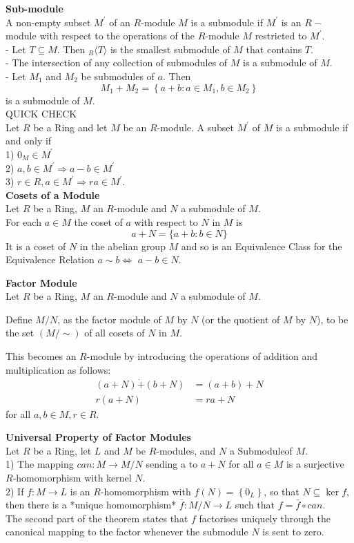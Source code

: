 \documentclass[a4paper, 10pt]{article}
\begin{document}
\begin{multicols*}{3}
\textbf{Sub-module}\\
A non-empty subset $M^{\prime}$ of an $R$-module $M$ is a submodule if $M^{\prime}$ is an $R-$ module with respect to the operations of the $R$-module $M$ restricted to $M^{\prime}$.\\
- Let $T \subseteq M$. Then ${ }_R\langle T\rangle$ is the smallest submodule of $M$ that contains $T$.\\
- The intersection of any collection of submodules of $M$ is a submodule of $M$.\\
- Let $M_1$ and $M_2$ be submodules of $a$. Then
$$
M_1+M_2=\left\{a+b: a \in M_1, b \in M_2\right\}
$$
	is a submodule of $M$.\\
QUICK CHECK\\
Let $R$ be a Ring and let $M$ be an $R$-module. A subset $M^{\prime}$ of $M$ is a submodule if and only if\\
1) $0_M \in M^{\prime}$\\
2) $a, b \in M^{\prime} \Rightarrow a-b \in M^{\prime}$\\
3) $r \in R, a \in M^{\prime} \Rightarrow r a \in M^{\prime}$.\\

\textbf{Cosets of a Module}\\
Let $R$ be a Ring, $M$ an $R$-module and $N$ a submodule of $M$. \\
For each $a \in M$ the coset of $a$ with respect to $N$ in $M$ is
$$
a+N=\{a+b: b \in N\}
$$
It is a coset of $N$ in the abelian group $M$ and so is an Equivalence Class for the Equivalence Relation $a \sim b \Leftrightarrow$ $a-b \in N$. 

\textbf{Factor Module}\\
Let $R$ be a Ring, $M$ an $R$-module and $N$ a submodule of $M$. 

Define $M / N$, as the factor module of $M$ by $N$ (or the quotient of $M$ by $N$), to be the set $(M / \sim)$ of all cosets of $N$ in $M$. 

This becomes an $R$-module by introducing the operations of addition and multiplication as follows:
$$
\begin{aligned}
(a+N) \dot{+}(b+N) & =(a+b)+N \\
r(a+N) & =r a+N
\end{aligned}
$$
for all $a, b \in M, r \in R$. 

\textbf{Universal Property of Factor Modules}\\
Let $R$ be a Ring, let $L$ and $M$ be $R$-modules, and $N$ a Submoduleof $M$.\\
1) The mapping $can : M \rightarrow M / N$ sending a to $a+N$ for all $a \in M$ is a surjective $R$-homomorphism with kernel $N$.\\
2) If $f: M \rightarrow L$ is an $R$-homomorphism with $f(N)=\left\{0_L\right\}$, so that $N \subseteq \operatorname{ker} f$, then there is a *unique homomorphism* $\bar{f}: M / N \rightarrow L$ such that $f=\bar{f} \circ can$.\\
The second part of the theorem states that $f$ factorises uniquely through the canonical mapping to the factor whenever the submodule $N$ is sent to zero.


\end{multicols*}
\end{document}
